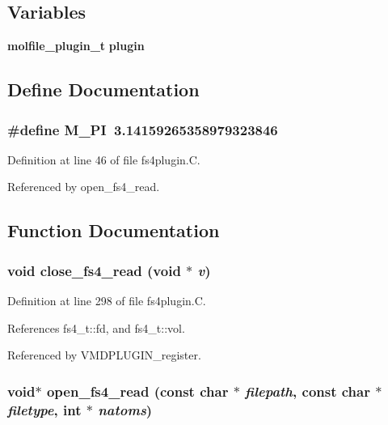 \subsection*{Variables}
\begin{CompactItemize}
\item 
{\bf molfile\_\-plugin\_\-t} {\bf plugin}
\end{CompactItemize}


\subsection{Define Documentation}
\subsubsection{\setlength{\rightskip}{0pt plus 5cm}\#define M\_\-PI\ 3.14159265358979323846}\label{fs4plugin_8C_a0}




Definition at line 46 of file fs4plugin.C.

Referenced by open\_\-fs4\_\-read.

\subsection{Function Documentation}
\subsubsection{\setlength{\rightskip}{0pt plus 5cm}void close\_\-fs4\_\-read (void $\ast$ {\em v})\hspace{0.3cm}{\tt  [static]}}\label{fs4plugin_8C_a5}




Definition at line 298 of file fs4plugin.C.

References fs4\_\-t::fd, and fs4\_\-t::vol.

Referenced by VMDPLUGIN\_\-register.
\subsubsection{\setlength{\rightskip}{0pt plus 5cm}void$\ast$ open\_\-fs4\_\-read (const char $\ast$ {\em filepath}, const char $\ast$ {\em filetype}, int $\ast$ {\em natoms})\hspace{0.3cm}{\tt  [static]}}\label{fs4plugin_8C_a2}




